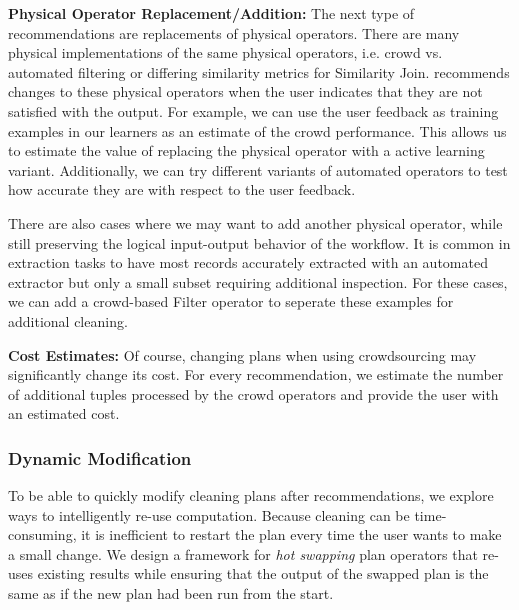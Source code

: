 {\noindent \bf Physical Operator Replacement/Addition:} The next type of recommendations are replacements of physical operators.
There are many physical implementations of the same physical operators, i.e. crowd vs. automated filtering or differing similarity metrics for Similarity Join. 
\sys recommends changes to these physical operators when the user indicates that they are not satisfied with the output.
For example, we can use the user feedback as training examples in our learners as an estimate of the crowd performance.
This allows us to estimate the value of replacing the physical operator with a active learning variant.
Additionally, we can try different variants of automated operators to test how accurate they are with respect to the user feedback.

There are also cases where we may want to add another physical operator, while still preserving the logical input-output behavior of the workflow.
It is common in extraction tasks to have most records accurately extracted with an automated extractor but only a small subset requiring additional inspection. 
For these cases, we can add a crowd-based Filter operator to seperate these examples for additional cleaning.

\vspace{.5em}

{\noindent \bf Cost Estimates:} Of course, changing plans when using crowdsourcing may significantly change its cost.
For every recommendation, we estimate the number of additional tuples processed by the crowd operators and provide 
the user with an estimated cost.

\subsubsection{Dynamic Modification}
To be able to quickly modify cleaning plans after recommendations, we explore ways to intelligently re-use computation. Because cleaning can be time-consuming, it is inefficient to 
restart the plan every time the user wants to make a small change.
We design a framework for \emph{hot swapping} plan operators that re-uses existing results while ensuring that the output of the swapped plan is the same as if the new plan had been run from the start.

